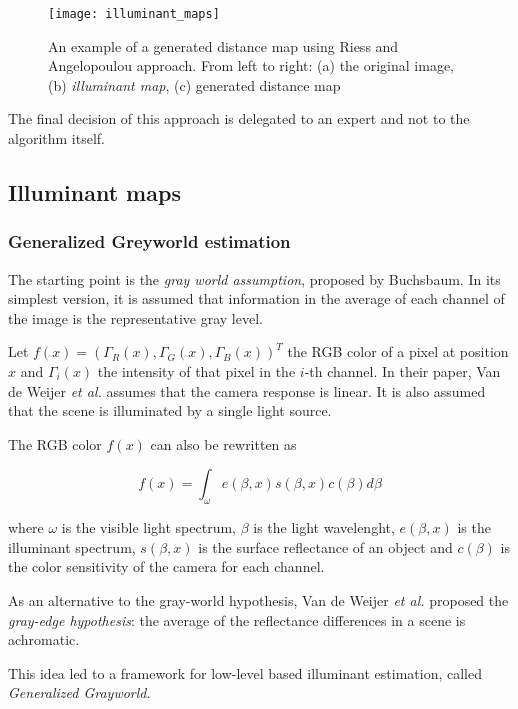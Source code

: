 \begin{figure}
  \centering
    \texttt{[image: illuminant\_maps]}
    \caption{An example of a generated distance map using Riess and Angelopoulou\cite{riess2010scene} approach. From left to right: (a) the original image, (b) \emph{illuminant map}, (c) generated distance map}
    \label{illuminant_maps}
\end{figure}

The final decision of this approach is delegated to an expert and not to the algorithm itself.

\subsection{Illuminant maps}


\subsubsection{Generalized Greyworld estimation}

The starting point is the \emph{gray world assumption}, proposed by Buchsbaum\cite{Buchsbaum19801}. In its simplest version, it is assumed that information in the average of each channel of the image is the representative gray level.

Let $f(x) = (\Gamma_R(x), \Gamma_G(x), \Gamma_B(x))^T$ the RGB color of a pixel at position $x$ and $\Gamma_i(x)$ the intensity of that pixel in the $i$-th channel. In their paper, Van de Weijer \emph{et al.} assumes that the camera response is linear. It is also assumed that the scene is illuminated by a single light source.

The RGB color $f(x)$ can also be rewritten as

\begin{equation}
f(x) = \int_{\omega} e(\beta, x) s(\beta, x) c(\beta) d\beta
\end{equation}

where $\omega$ is the visible light spectrum, $\beta$ is the light wavelenght, $e(\beta, x)$ is the illuminant spectrum, $s(\beta, x)$ is the surface reflectance of an object and $c(\beta)$ is the color sensitivity of the camera for each channel.

As an alternative to the gray-world hypothesis, Van de Weijer \emph{et al.}\cite{van2007edge} proposed the \emph{gray-edge hypothesis}: the average of the reflectance differences in a scene is achromatic.

This idea led to a framework for low-level based illuminant estimation, called \emph{Generalized Grayworld}.


